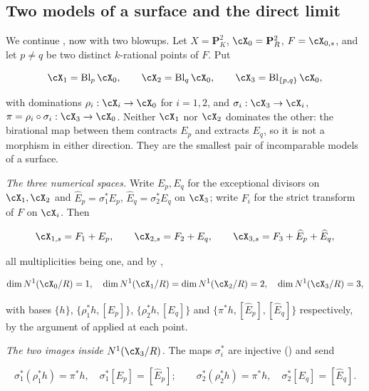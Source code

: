 \subsection{Two models of a surface and the direct limit}
\label{sec:ch20-ex-two-model}

\begin{example}
\label{ex:ch20-two-model-surface}
We continue , now with two blowups.  Let
$X=\mathbf P^2_K$, $\cX_0=\mathbf P^2_R$, $F=\cX_{0,s}$, and let
$p\neq q$ be two distinct $k$-rational points of $F$.  Put

\[
 \cX_1=\operatorname{Bl}_p\cX_0,\qquad
 \cX_2=\operatorname{Bl}_q\cX_0,\qquad
 \cX_3=\operatorname{Bl}_{\{p,q\}}\cX_0 ,
\]

with dominations $\rho_i:\cX_i\to\cX_0$ for $i=1,2$, and
$\sigma_i:\cX_3\to\cX_i$, $\pi=\rho_i\circ\sigma_i:\cX_3\to\cX_0$.
Neither $\cX_1$ nor $\cX_2$ dominates the other: the birational map
between them contracts $E_p$ and extracts $E_q$, so it is not a
morphism in either direction.  They are the smallest pair of incomparable
models of a surface.

\emph{The three numerical spaces.}  Write $E_p,E_q$ for the exceptional
divisors on $\cX_1,\cX_2$ and $\widehat E_p=\sigma_1^*E_p$,
$\widehat E_q=\sigma_2^*E_q$ on $\cX_3$; write $F_i$ for the strict
transform of $F$ on $\cX_i$.  Then

\[
 \cX_{1,s}=F_1+E_p,\qquad
 \cX_{2,s}=F_2+E_q,\qquad
 \cX_{3,s}=F_3+\widehat E_p+\widehat E_q ,
\]

all multiplicities being one, and by ,

\begin{equation}
\label{eq:ch20-two-model-dimensions}
 \dim N^1(\cX_0/R)=1,\quad
 \dim N^1(\cX_1/R)=\dim N^1(\cX_2/R)=2,\quad
 \dim N^1(\cX_3/R)=3 ,
\end{equation}

with bases $\{h\}$, $\{\rho_1^*h,[E_p]\}$, $\{\rho_2^*h,[E_q]\}$ and
$\{\pi^*h,[\widehat E_p],[\widehat E_q]\}$ respectively, by the argument
of  applied at each point.

\emph{The two images inside $N^1(\cX_3/R)$.}  The maps $\sigma_i^*$ are
injective () and send

\[
 \sigma_1^*(\rho_1^*h)=\pi^*h,\quad
 \sigma_1^*[E_p]=[\widehat E_p];
 \qquad
 \sigma_2^*(\rho_2^*h)=\pi^*h,\quad
 \sigma_2^*[E_q]=[\widehat E_q].
\]


\end{example}
